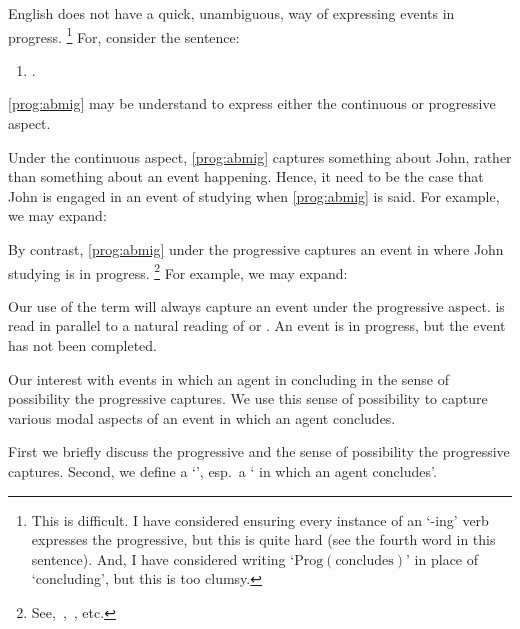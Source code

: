 \begin{note}
  English does not have a quick, unambiguous, way of expressing events in progress.%
  \footnote{
    This is difficult.
    I have considered ensuring every instance of an `-ing' verb expresses the progressive, but this is quite hard (see the fourth word in this sentence).
    And, I have considered writing `\(\text{Prog}(\text{concludes})\)' in place of `concluding', but this is too clumsy.
  }
  For, consider the sentence:
  \begin{enumerate}[label=\arabic*., ref=(\arabic*)]
  \item
    \label{prog:abmig}
    .
  \end{enumerate}
  \ref{prog:abmig} may be understand to express either the continuous or progressive aspect.

  Under the continuous aspect, \ref{prog:abmig} captures something about John, rather than something about an event happening.
  Hence, it need to be the case that John is engaged in an event of studying when \ref{prog:abmig} is said.
  For example, we may expand:

  By contrast, \ref{prog:abmig} under the progressive captures an event in where John studying is in progress.%
  \footnote{
    See,~\textcite{Richards:1981wo},~\textcite{Portner:2011vi}, etc.
  }
  For example, we may expand:
\end{note}

\begin{note}
  Our use of the term  will always capture an event under the progressive aspect.
   is read in parallel to a natural reading of   or .
  An event is in progress, but the event has not been completed.
\end{note}

\begin{note}
  Our interest with events in which an agent in concluding in the sense of possibility the progressive captures.
  We use this sense of possibility to capture various modal aspects of an event in which an agent concludes.

  First we briefly discuss the progressive and the sense of possibility the progressive captures.
  Second, we define a `\pevent{}', esp.\ a `\pevent{} in which an agent concludes'.
\end{note}

